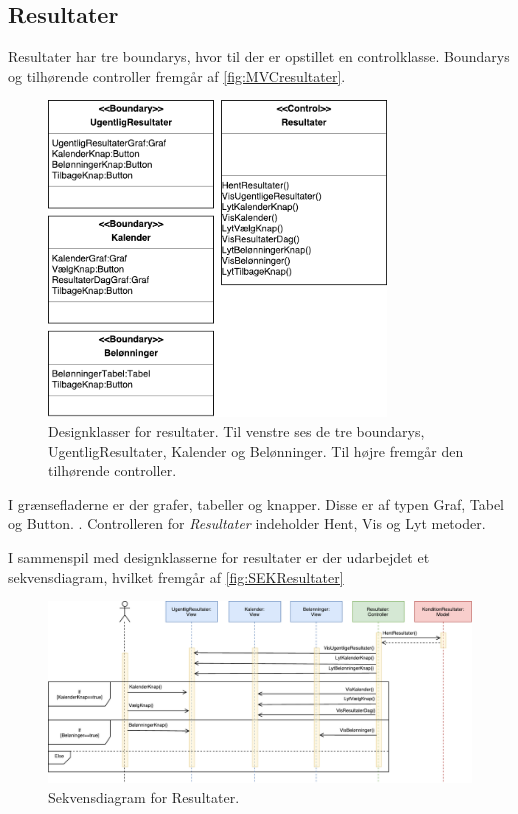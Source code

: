 \subsection*{Resultater}
Resultater har tre boundarys, hvor til der er opstillet en controlklasse. Boundarys og tilhørende controller fremgår af \autoref{fig:MVCresultater}. 

\begin{figure} [H]
\centering
\includegraphics[width=0.8\textwidth]{figures/MVC/MVCResultater}
\caption{Designklasser for resultater. Til venstre ses de tre boundarys, UgentligResultater, Kalender og Belønninger. Til højre fremgår den tilhørende controller.}
\label{fig:MVCresultater}
\end{figure}

\noindent
I grænsefladerne er der grafer, tabeller og knapper. Disse er af typen Graf, Tabel og Button.  . 
Controlleren for \textit{Resultater} indeholder Hent, Vis og Lyt metoder. 

I sammenspil med designklasserne for resultater er der udarbejdet et sekvensdiagram, hvilket fremgår af \autoref{fig:SEKResultater}

\begin{figure} [H]
\centering
\includegraphics[width=1\textwidth]{figures/Sek/SEKResultater}
\caption{Sekvensdiagram for Resultater.}
\label{fig:SEKResultater}
\end{figure} 

